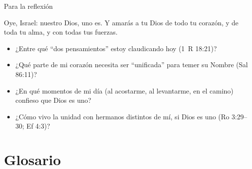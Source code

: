 \begin{frame}{Para la reflexión}
\begin{cita}Oye, Israel: \SENOR{} nuestro Dios, \SENOR{} uno es. Y amarás a \SENOR{} tu Dios de todo tu corazón, y de toda tu alma, y con todas tus fuerzas.\end{cita}
\begin{center}\end{center}
\small
\begin{itemize}
\item ¿Entre qué ``dos pensamientos'' estoy claudicando hoy (1~R 18:21)?
\item ¿Qué parte de mi corazón necesita ser ``unificada'' para temer su Nombre (Sal 86:11)?
\item ¿En qué momentos de mi día (al acostarme, al levantarme, en el camino) confieso que Dios es uno?
\item ¿Cómo vivo la unidad con hermanos distintos de mí, si Dios es uno (Ro 3:29--30; Ef 4:3)?
\end{itemize}
\end{frame}

\section{Glosario}


